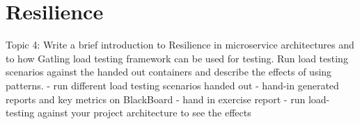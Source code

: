 \chapter{Resilience}\label{ch:resilience}
Topic 4: Write a brief introduction to Resilience in microservice architectures and to how Gatling load testing framework can be used for testing. Run load testing scenarios against the handed out containers and describe the effects of using patterns.
- run different load testing scenarios handed out
- hand-in generated reports and key metrics on BlackBoard 
- hand in exercise report
- run load-testing against your project architecture to see the effects
